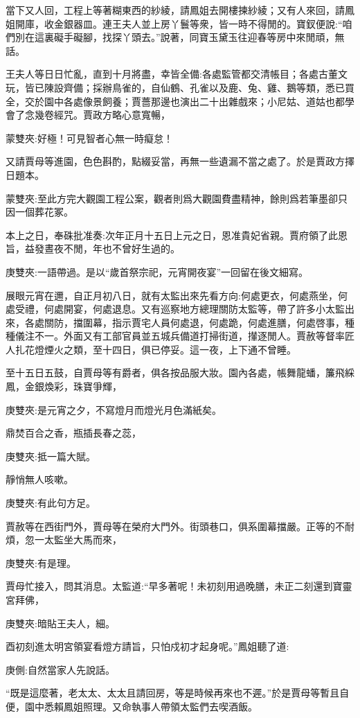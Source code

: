 \begin{parag}
    當下又人回，工程上等著糊東西的紗綾，請鳳姐去開樓揀紗綾；又有人來回，請鳳姐開庫，收金銀器皿。連王夫人並上房丫鬟等衆，皆一時不得閒的。寶釵便說:“咱們別在這裏礙手礙腳，找探丫頭去。”說著，同寶玉黛玉往迎春等房中來閒頑，無話。
\end{parag}


\begin{parag}
    王夫人等日日忙亂，直到十月將盡，幸皆全備:各處監管都交清帳目；各處古董文玩，皆已陳設齊備；採辦鳥雀的，自仙鶴、孔雀以及鹿、兔、雞、鵝等類，悉已買全，交於園中各處像景飼養；賈薔那邊也演出二十出雜戲來；小尼姑、道姑也都學會了念幾卷經咒。賈政方略心意寬暢，\begin{note}蒙雙夾:好極！可見智者心無一時癡怠！\end{note}又請賈母等進園，色色斟酌，點綴妥當，再無一些遺漏不當之處了。於是賈政方擇日題本。\begin{note}蒙雙夾:至此方完大觀園工程公案，觀者則爲大觀園費盡精神，餘則爲若筆墨卻只因一個葬花冢。\end{note}本上之日，奉硃批准奏:次年正月十五日上元之日，恩准貴妃省親。賈府領了此恩旨，益發晝夜不閒，年也不曾好生過的。\begin{note}庚雙夾:一語帶過。是以“歲首祭宗祀，元宵開夜宴”一回留在後文細寫。\end{note}
\end{parag}


\begin{parag}
    展眼元宵在邇，自正月初八日，就有太監出來先看方向:何處更衣，何處燕坐，何處受禮，何處開宴，何處退息。又有巡察地方總理關防太監等，帶了許多小太監出來，各處關防，擋圍幕，指示賈宅人員何處退，何處跪，何處進膳，何處啓事，種種儀注不一。外面又有工部官員並五城兵備道打掃街道，攆逐閒人。賈赦等督率匠人扎花燈煙火之類，至十四日，俱已停妥。這一夜，上下通不曾睡。
\end{parag}


\begin{parag}
    至十五日五鼓，自賈母等有爵者，俱各按品服大妝。園內各處，帳舞龍蟠，簾飛綵鳳，金銀煥彩，珠寶爭輝，\begin{note}庚雙夾:是元宵之夕，不寫燈月而燈光月色滿紙矣。\end{note}鼎焚百合之香，瓶插長春之蕊，\begin{note}庚雙夾:抵一篇大賦。\end{note}靜悄無人咳嗽。\begin{note}庚雙夾:有此句方足。\end{note}賈赦等在西街門外，賈母等在榮府大門外。街頭巷口，俱系圍幕擋嚴。正等的不耐煩，忽一太監坐大馬而來，\begin{note}庚雙夾:有是理。\end{note}賈母忙接入，問其消息。太監道:“早多著呢！未初刻用過晚膳，未正二刻還到寶靈宮拜佛，\begin{note}庚雙夾:暗貼王夫人，細。\end{note}酉初刻進太明宮領宴看燈方請旨，只怕戍初才起身呢。”鳳姐聽了道:\begin{note}庚側:自然當家人先說話。\end{note}“既是這麼著，老太太、太太且請回房，等是時候再來也不遲。”於是賈母等暫且自便，園中悉賴鳳姐照理。又命執事人帶領太監們去喫酒飯。
\end{parag}


